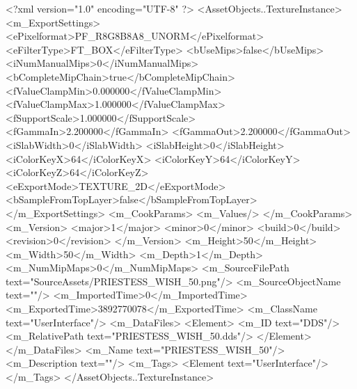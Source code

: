 <?xml version="1.0" encoding="UTF-8" ?>
<AssetObjects..TextureInstance>
	<m_ExportSettings>
		<ePixelformat>PF_R8G8B8A8_UNORM</ePixelformat>
		<eFilterType>FT_BOX</eFilterType>
		<bUseMips>false</bUseMips>
		<iNumManualMips>0</iNumManualMips>
		<bCompleteMipChain>true</bCompleteMipChain>
		<fValueClampMin>0.000000</fValueClampMin>
		<fValueClampMax>1.000000</fValueClampMax>
		<fSupportScale>1.000000</fSupportScale>
		<fGammaIn>2.200000</fGammaIn>
		<fGammaOut>2.200000</fGammaOut>
		<iSlabWidth>0</iSlabWidth>
		<iSlabHeight>0</iSlabHeight>
		<iColorKeyX>64</iColorKeyX>
		<iColorKeyY>64</iColorKeyY>
		<iColorKeyZ>64</iColorKeyZ>
		<eExportMode>TEXTURE_2D</eExportMode>
		<bSampleFromTopLayer>false</bSampleFromTopLayer>
	</m_ExportSettings>
	<m_CookParams>
		<m_Values/>
	</m_CookParams>
	<m_Version>
		<major>1</major>
		<minor>0</minor>
		<build>0</build>
		<revision>0</revision>
	</m_Version>
	<m_Height>50</m_Height>
	<m_Width>50</m_Width>
	<m_Depth>1</m_Depth>
	<m_NumMipMaps>0</m_NumMipMaps>
	<m_SourceFilePath text="SourceAssets/PRIESTESS_WISH_50.png"/>
	<m_SourceObjectName text=""/>
	<m_ImportedTime>0</m_ImportedTime>
	<m_ExportedTime>3892770078</m_ExportedTime>
	<m_ClassName text="UserInterface"/>
	<m_DataFiles>
		<Element>
			<m_ID text="DDS"/>
			<m_RelativePath text="PRIESTESS_WISH_50.dds"/>
		</Element>
	</m_DataFiles>
	<m_Name text="PRIESTESS_WISH_50"/>
	<m_Description text=""/>
	<m_Tags>
		<Element text="UserInterface"/>
	</m_Tags>
</AssetObjects..TextureInstance>

